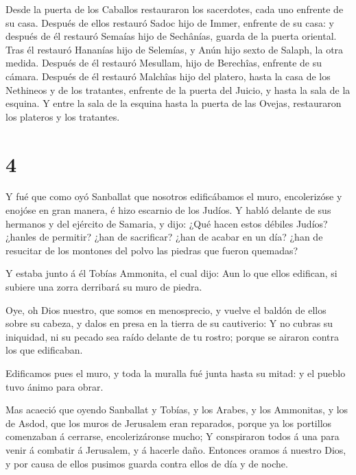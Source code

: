  Desde la puerta de los Caballos restauraron los
sacerdotes, cada uno enfrente de su casa.  Después de ellos
restauró Sadoc hijo de Immer, enfrente de su casa: y después de él
restauró Semaías hijo de Sechânías, guarda de la puerta oriental.
 Tras él restauró Hananías hijo de Selemías, y Anún hijo
sexto de Salaph, la otra medida. Después de él restauró Mesullam, hijo
de Berechîas, enfrente de su cámara.  Después de él
restauró Malchîas hijo del platero, hasta la casa de los Nethineos y de
los tratantes, enfrente de la puerta del Juicio, y hasta la sala de la
esquina.  Y entre la sala de la esquina hasta la puerta de
las Ovejas, restauraron los plateros y los tratantes.

\hypertarget{section-3}{%
\section{4}\label{section-3}}

 Y fué que como oyó Sanballat que nosotros edificábamos el
muro, encolerizóse y enojóse en gran manera, é hizo escarnio de los
Judíos.  Y habló delante de sus hermanos y del ejército de
Samaria, y dijo: ¿Qué hacen estos débiles Judíos? ¿hanles de permitir?
¿han de sacrificar? ¿han de acabar en un día? ¿han de resucitar de los
montones del polvo las piedras que fueron quemadas?

 Y estaba junto á él Tobías Ammonita, el cual dijo: Aun lo
que ellos edifican, si subiere una zorra derribará su muro de piedra.

 Oye, oh Dios nuestro, que somos en menosprecio, y vuelve el
baldón de ellos sobre su cabeza, y dalos en presa en la tierra de su
cautiverio:  Y no cubras su iniquidad, ni su pecado sea
raído delante de tu rostro; porque se airaron contra los que edificaban.

 Edificamos pues el muro, y toda la muralla fué junta hasta
su mitad: y el pueblo tuvo ánimo para obrar.

 Mas acaeció que oyendo Sanballat y Tobías, y los Arabes, y
los Ammonitas, y los de Asdod, que los muros de Jerusalem eran
reparados, porque ya los portillos comenzaban á cerrarse,
encolerizáronse mucho;  Y conspiraron todos á una para venir
á combatir á Jerusalem, y á hacerle daño.  Entonces oramos á
nuestro Dios, y por causa de ellos pusimos guarda contra ellos de día y
de noche.

